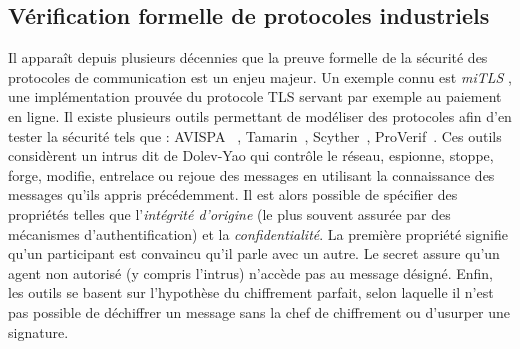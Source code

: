\documentclass{article}
\newcommand{\proverif}{ProVerif\xspace}
\newcommand{\avispa}{AVISPA\xspace}
\newcommand{\clatse}{CL-Atse\xspace}
\newcommand{\ofmc}{OFMC\xspace}
\newcommand{\satmc}{SAT-MC\xspace}
\newcommand{\tasp}{TA4SP\xspace}
\newcommand{\tamarin}{Tamarin\xspace}
\newcommand{\scyther}{Scyther\xspace}
\newcommand{\aramis}{ARAMIS\xspace}
\begin{document}
%        

\subsection{Vérification formelle de protocoles industriels}\label{sec:protocols}

Il apparaît depuis plusieurs décennies que la preuve formelle de
la sécurité des protocoles de communication est un enjeu majeur.
Un exemple connu est {\em miTLS} \cite{BFKPS13}, une implémentation prouvée
du protocole TLS \cite{DR08} servant par exemple au paiement en ligne.
Il existe plusieurs outils permettant de modéliser des protocoles afin d'en
tester la sécurité tels que : \avispa~\cite{AVISPA05}%
, \tamarin~\cite{MSCB13}, \scyther~\cite{Cre08}, \proverif~\cite{Bla01}.
Ces outils considèrent un intrus dit de Dolev-Yao \cite{DY81} qui contrôle le
réseau, espionne, stoppe, forge, modifie, entrelace ou rejoue des messages en
utilisant la connaissance des messages qu'ils appris précédemment.
Il est alors possible de spécifier des propriétés telles que l'{\em intégrité
d'origine} (le plus souvent assurée par des mécanismes d'authentification) et la
{\em confidentialité}.
La première propriété signifie qu'un participant est convaincu qu'il parle avec
un autre.
Le secret assure qu'un agent non autorisé (y compris l'intrus) n'accède pas au
message désigné.
Enfin, les outils se basent sur l'hypothèse du chiffrement parfait, selon
laquelle il n'est pas possible de déchiffrer un message sans la chef de
chiffrement ou d'usurper une signature.
\end{document}
